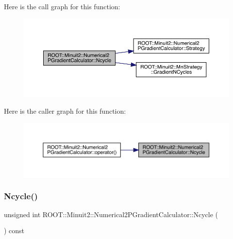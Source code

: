 Here is the call graph for this function\+:
\nopagebreak
\begin{figure}[H]
\begin{center}
\leavevmode
\includegraphics[width=350pt]{d0/d82/classROOT_1_1Minuit2_1_1Numerical2PGradientCalculator_ace5b19ee0df4e3cd09333f519112d2b3_cgraph}
\end{center}
\end{figure}
Here is the caller graph for this function\+:
\nopagebreak
\begin{figure}[H]
\begin{center}
\leavevmode
\includegraphics[width=350pt]{d0/d82/classROOT_1_1Minuit2_1_1Numerical2PGradientCalculator_ace5b19ee0df4e3cd09333f519112d2b3_icgraph}
\end{center}
\end{figure}
\mbox{\label{classROOT_1_1Minuit2_1_1Numerical2PGradientCalculator_ace5b19ee0df4e3cd09333f519112d2b3}} 
\subsubsection{\texorpdfstring{Ncycle()}{Ncycle()}\hspace{0.1cm}{\footnotesize\ttfamily [3/3]}}
{\footnotesize\ttfamily unsigned int R\+O\+O\+T\+::\+Minuit2\+::\+Numerical2\+P\+Gradient\+Calculator\+::\+Ncycle (\begin{DoxyParamCaption}{ }\end{DoxyParamCaption}) const}

